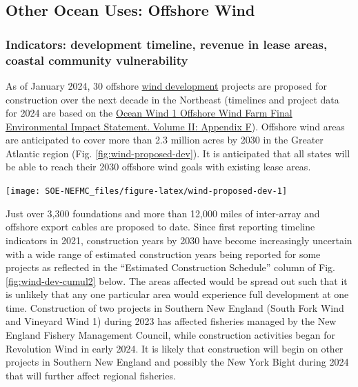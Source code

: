 \documentclass[
  10pt,
]{article}
\let\origfigure\figure
\let\endorigfigure\endfigure
\renewenvironment{figure}[1][2] {
    \expandafter\origfigure\expandafter[H]
} {
    \endorigfigure
}
\begin{document}
\hypertarget{other-ocean-uses-offshore-wind}{%
\subsection{Other Ocean Uses: Offshore Wind}\label{other-ocean-uses-offshore-wind}}

\hypertarget{indicators-development-timeline-revenue-in-lease-areas-coastal-community-vulnerability}{%
\subsubsection{Indicators: development timeline, revenue in lease areas, coastal community vulnerability}\label{indicators-development-timeline-revenue-in-lease-areas-coastal-community-vulnerability}}

As of January 2024, 30 offshore \href{https://noaa-edab.github.io/catalog/speed-and-scale-of-offshore-wind-development-in-the-northeast.html}{wind development} projects are proposed for construction over the next decade in the Northeast (timelines and project data for 2024 are based on the \href{https://www.boem.gov/sites/default/files/documents/renewable-energy/state-activities/Ocean_Wind1_FEIS_App_F_Planned\%20Activities\%20Scenario.pdf}{Ocean Wind 1 Offshore Wind Farm Final Environmental Impact Statement. Volume II: Appendix F}). Offshore wind areas are anticipated to cover more than 2.3 million acres by 2030 in the Greater Atlantic region (Fig. \ref{fig:wind-proposed-dev}). It is anticipated that all states will be able to reach their 2030 offshore wind goals with existing lease areas.

\begin{figure}

{\centering \texttt{[image: SOE-NEFMC\_files/figure-latex/wind-proposed-dev-1]} 

}

\caption{Proposed wind development on the northeast shelf.}\label{fig:wind-proposed-dev}
\end{figure}

Just over 3,300 foundations and more than 12,000 miles of inter-array and offshore export cables are proposed to date. Since first reporting timeline indicators in 2021, construction years by 2030 have become increasingly uncertain with a wide range of estimated construction years being reported for some projects as reflected in the ``Estimated Construction Schedule'' column of Fig. \ref{fig:wind-dev-cumul2} below. The areas affected would be spread out such that it is unlikely that any one particular area would experience full development at one time. Construction of two projects in Southern New England (South Fork Wind and Vineyard Wind 1) during 2023 has affected fisheries managed by the New England Fishery Management Council, while construction activities began for Revolution Wind in early 2024. It is likely that construction will begin on other projects in Southern New England and possibly the New York Bight during 2024 that will further affect regional fisheries.
\end{document}
